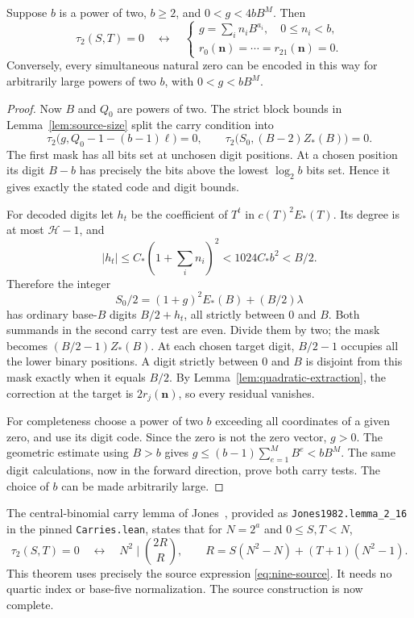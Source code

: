 \begin{lemma}
\label{lem:carry-decoder}
Suppose $b$ is a power of two, $b\ge2$, and $0<g<4bB^M$. Then
\[
 \tau_2(S,T)=0
 \quad\longleftrightarrow\quad
 \begin{cases}
 g=\sum_i n_iB^{a_i},\quad 0\le n_i<b,\\
 r_0(\mathbf n)=\cdots=r_{21}(\mathbf n)=0.
 \end{cases}
\]
Conversely, every simultaneous natural zero can be encoded in this
way for arbitrarily large powers of two $b$, with $0<g<bB^M$.
\end{lemma}
\begin{proof}
Now $B$ and $Q_0$ are powers of two. The strict block bounds in
Lemma~\ref{lem:source-size} split the carry condition into
\[
 \tau_2\bigl(g,Q_0-1-(b-1)\ell\bigr)=0,
 \qquad
 \tau_2\bigl(S_0,(B-2)Z_*(B)\bigr)=0.
\]
The first mask has all bits set at unchosen digit positions. At a
chosen position its digit $B-b$ has precisely the bits above the
lowest $\log_2b$ bits set. Hence it gives exactly the stated code
and digit bounds.

For decoded digits let $h_t$ be the coefficient of $T^t$ in
$c(T)^2E_*(T)$. Its degree is at most $\mathcal H-1$, and
\[
 |h_t|\le C_*\left(1+\sum_i n_i\right)^2
 <1024C_*b^2<B/2.
\]
Therefore the integer
\[
 S_0/2=(1+g)^2E_*(B)+(B/2)\lambda
\]
has ordinary base-$B$ digits $B/2+h_t$, all strictly between $0$
and $B$. Both summands in the second carry test are even. Divide
them by two; the mask becomes $(B/2-1)Z_*(B)$.
At each chosen target digit, $B/2-1$ occupies all the lower binary
positions. A digit strictly between $0$ and $B$ is disjoint from
this mask exactly when it equals $B/2$. By
Lemma~\ref{lem:quadratic-extraction}, the correction at the target
is $2r_j(\mathbf n)$, so every residual vanishes.

For completeness choose a power of two $b$ exceeding all coordinates
of a given zero, and use its digit code. Since the zero is not the
zero vector, $g>0$. The geometric estimate using $B>b$ gives
$g\le(b-1)\sum_{e=1}^M B^e<bB^M$. The same digit calculations,
now in the forward direction, prove both carry tests. The choice of
$b$ can be made arbitrarily large.
\end{proof}

The central-binomial carry lemma of Jones~\cite{jones1982}, provided
as \texttt{Jones1982.lemma\_2\_16} in the pinned
\texttt{Carries.lean}, states that for $N=2^a$ and $0\le S,T<N$,
\begin{equation}
 \tau_2(S,T)=0
 \quad\longleftrightarrow\quad
 N^2\mid\binom{2R}{R},
 \qquad R=S(N^2-N)+(T+1)(N^2-1).
 \label{eq:carry-binomial}
\end{equation}
This theorem uses precisely the source expression
\eqref{eq:nine-source}. It needs no quartic index or base-five
normalization. The source construction is now complete.


